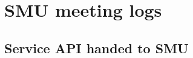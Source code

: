 \chapter{SMU meeting logs}
\label{Appendix_SMU}

\section{Service API handed to SMU}
\label{Appendix_SMU_API}